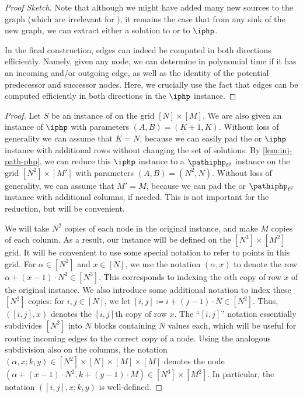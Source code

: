 \documentclass[10pt,a4paper]{article}
\theoremstyle{definition}
\theoremstyle{plain}
\theoremstyle{remark}
\begin{document}
\begin{proof}[Proof Sketch]
Note that although we might have added many new sources to the graph (which are irrelevant for \sopl), it remains the case that from any sink of the new graph, we can extract either a solution to \sod or to $\iphp$.

In the final construction, edges can indeed be computed in both directions efficiently. Namely, given any node, we can determine in polynomial time if it has an incoming and/or outgoing edge, as well as the identity of the potential predecessor and successor nodes. Here, we crucially use the fact that edges can be computed efficiently in both directions in the $\iphp$ instance.
\end{proof}


\begin{proof}
Let $S$ be an instance of \sod on the grid $[N] \times [M]$. We are also given an instance of $\iphp$ with parameters $(A,B) = (K+1,K)$. Without loss of generality we can assume that $K = N$, because we can easily pad the \sod or $\iphp$ instance with additional rows without changing the set of solutions. By \cref{lem:inj-path-php}, we can reduce this $\iphp$ instance to a $\pathiphp_{t^2}$ instance on the grid $[N^2] \times [M']$ with parameters $(A,B) = (N^2,N)$. Without loss of generality, we can assume that $M' = M$, because we can pad the \sod or $\pathiphp_{t^2}$ instance with additional columns, if needed. This is not important for the reduction, but will be convenient.

We will take $N^2$ copies of each node in the original \sod instance, and make $M$ copies of each column. As a result, our \sopl instance will be defined on the $[N^3] \times [M^2]$ grid. It will be convenient to use some special notation to refer to points in this grid. For $\alpha \in [N^2]$ and $x \in [N]$, we use the notation $(\alpha, x)$ to denote the row $\alpha + (x-1) \cdot N^2 \in [N^3]$. This corresponds to indexing the $\alpha$th copy of row $x$ of the original instance. We also introduce some additional notation to index these $[N^2]$ copies: for $i,j \in [N]$, we let $[i,j] \coloneqq i + (j-1) \cdot N \in [N^2]$. Thus, $([i,j], x)$ denotes the $[i,j]$th copy of row $x$. The ``$[i,j]$'' notation essentially subdivides $[N^2]$ into $N$ blocks containing $N$ values each, which will be useful for routing incoming edges to the correct copy of a node. Using the analogous subdivision also on the columns, the notation $(\alpha,x;k,y) \in [N^2] \times [N] \times [M] \times [M]$ denotes the node $(\alpha + (x-1) \cdot N^2, k + (y-1) \cdot M) \in [N^3] \times [M^2]$. In particular, the notation $([i,j],x;k,y)$ is well-defined.


\end{proof}
\end{document}
